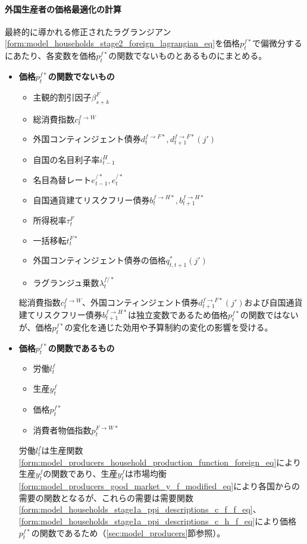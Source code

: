 \paragraph{外国生産者の価格最適化の計算}
\label{sec:chapter3_assumptions_producer_optimization_foreign_calculation}
最終的に導かれる修正されたラグランジアン\eqref{form:model_households_stage2_foreign_lagrangian_eq}を価格\(p_t^{f*}\)で偏微分するにあたり、各変数を価格\(p_t^{f*}\)の関数でないものとあるものにまとめる。
\begin{itemize}
    \item
    \label{itm:chapter3_assumptions_producer_optimization_foreign_calculation_remark1}
        \textbf{価格\(p_t^{f*}\)の関数でないもの}
        \begin{itemize}
            \item 主観的割引因子\(\beta_{s+k}^F\)
            \item 総消費指数\(c_t^{f\to W}\)
            \item 外国コンティンジェント債券\(d_t^{f\to F*}, d_{t+1}^{f\to F*}(j')\)
            \item 自国の名目利子率\(i_{t-1}^H\)
            \item 名目為替レート\(e_{t-1}^{/*}, e_t^{/*}\)
            \item 自国通貨建てリスクフリー債券\(b_t^{f\to H*}, b_{t+1}^{f\to H*}\)
            \item 所得税率\(\tau_t^F\)
            \item 一括移転\(t_t^{F*}\)
            \item 外国コンティンジェント債券の価格\(q_{t,t+1}^*(j')\)
            \item ラグランジュ乗数\(\lambda_t^{f/*}\)
        \end{itemize}
        総消費指数\(c_t^{f\to W}\)、外国コンティンジェント債券\(d_{t+1}^{f\to F*}(j')\)および自国通貨建てリスクフリー債券\(b_{t+1}^{f\to H*}\)は独立変数であるため価格\(p_t^{f*}\)の関数ではないが、価格\(p_t^{f*}\)の変化を通じた効用や予算制約の変化の影響を受ける。
    \item
    \label{itm:chapter3_assumptions_producer_optimization_foreign_calculation_remark2}
        \textbf{価格\(p_t^{f*}\)の関数であるもの}
        \begin{itemize}
            \item 労働\(l_t^f\)
            \item 生産\(y_t^f\)
            \item 価格\(p_t^{f*}\)
            \item 消費者物価指数\(p_t^{F\to W*}\)
        \end{itemize}
        労働\(l_t^f\)は生産関数\eqref{form:model_producers_household_production_function_foreign_eq}により生産\(y_t^f\)の関数であり、生産\(y_t^f\)は市場均衡\eqref{form:model_producers_good_market_y_f_modified_eq}により各国からの需要の関数となるが、これらの需要は需要関数\eqref{form:model_households_stage1a_ppi_descriptions_c_f_f_eq}、\eqref{form:model_households_stage1a_ppi_descriptions_c_h_f_eq}により価格\(p_t^{f*}\)の関数であるため（\ref{sec:model_producers}節参照）。
\end{itemize}
